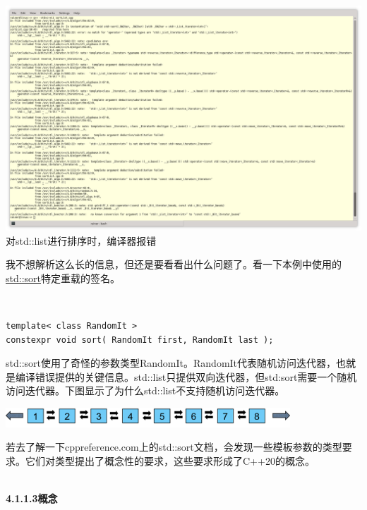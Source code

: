 \begin{center}
\includegraphics[width=1.0\textwidth]{content/3/chapter4/images/4.png}\\
对std::list进行排序时，编译器报错
\end{center}

我不想解析这么长的信息，但还是要看看出什么问题了。看一下本例中使用的\href{https://en.cppreference.com/w/cpp/algorithm/sort}{std::sort}特定重载的签名。

\hspace*{\fill} \\ %
\begin{lstlisting}[style=styleCXX]
template< class RandomIt >
constexpr void sort( RandomIt first, RandomIt last );
\end{lstlisting}

std::sort使用了奇怪的参数类型RandomIt。RandomIt代表随机访问迭代器，也就是编译错误提供的关键信息。std::list只提供双向迭代器，但std:sort需要一个随机访问迭代器。下图显示了为什么std::list不支持随机访问迭代器。

\begin{center}
\includegraphics[width=0.8\textwidth]{content/3/chapter4/images/5.png}\\
\end{center}

若去了解一下cppreference.com上的std::sort文档，会发现一些模板参数的类型要求。它们对类型提出了概念性的要求，这些要求形成了C++20的概念。

\hspace*{\fill} \\ %
\noindent
\textbf{4.1.1.3\hspace{0.2cm}概念}

